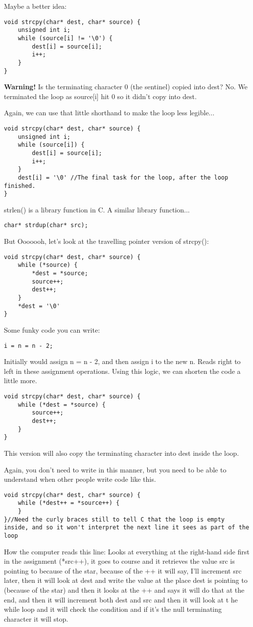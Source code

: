 \documentclass[12pt]{article}
\theoremstyle{definition}
\begin{document}
Maybe a better idea:
\begin{lstlisting}
void strcpy(char* dest, char* source) {
    unsigned int i;
    while (source[i] != '\0') {
        dest[i] = source[i];
        i++;
    }     
}
\end{lstlisting}
\textbf{Warning!} Is the terminating character 0 (the sentinel) copied into dest? No. We terminated the loop as source[i] hit 0 so it didn't copy into dest. 

Again, we can use that little shorthand to make the loop less legible...
\begin{lstlisting}
void strcpy(char* dest, char* source) {
    unsigned int i;
    while (source[i]) {
        dest[i] = source[i];
        i++;
    }     
    dest[i] = '\0' //The final task for the loop, after the loop finished. 
}
\end{lstlisting}
strlen() is a library function in C. 
A similar library function... 
\begin{lstlisting}
char* strdup(char* src);
\end{lstlisting}
But Ooooooh, let's look at the travelling pointer version of strcpy(): 
\begin{lstlisting}
void strcpy(char* dest, char* source) {
    while (*source) {
        *dest = *source;
        source++;
        dest++;
    }     
    *dest = '\0'
}
\end{lstlisting}

Some funky code you can write:
\begin{lstlisting}
i = n = n - 2; 
\end{lstlisting}
Initially would assign n = n - 2, and then assign i to the new n. Reads right to left in these assignment operations. Using this logic, we can shorten the code a little more. 
\begin{lstlisting}
void strcpy(char* dest, char* source) {
    while (*dest = *source) {
        source++;
        dest++;
    }     
}
\end{lstlisting}
This version will also copy the terminating character into dest inside the loop.

Again, you don't need to write in this manner, but you need to be able to understand when other people write code like this. 
\begin{lstlisting}
void strcpy(char* dest, char* source) {
    while (*dest++ = *source++) {
    } 
}//Need the curly braces still to tell C that the loop is empty inside, and so it won't interpret the next line it sees as part of the loop 

\end{lstlisting}
How the computer reads this line: 
Looks at everything at the right-hand side first in the assignment (*src++), it goes to course and it retrieves the value src is pointing to because of the star, because of the ++ it will say, I'll increment src later, then it will look at dest and write the value at the place dest is pointing to (because of the star) and then it looks at the ++ and says it
will do that at the end, and then it will increment both dest and src and then it will look at t he while loop and it will check the condition and if it's the null terminating character it will stop. 
\end{document}
